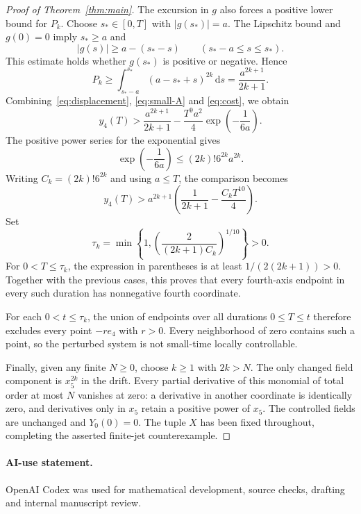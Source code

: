 \documentclass[11pt,a4paper]{article}
\newcommand{\dd}{\,\mathrm{d}}
\begin{document}
\begin{proof}[Proof of Theorem~\ref{thm:main}]
The excursion in $g$ also forces a positive lower bound for $P_k$.
Choose $s_*\in[0,T]$ with $|g(s_*)|=a$.
The Lipschitz bound and $g(0)=0$ imply $s_*\ge a$ and
\[
 |g(s)|\ge a-(s_*-s)\qquad (s_*-a\le s\le s_*).
\]
This estimate holds whether $g(s_*)$ is positive or negative. Hence
\begin{equation}\label{eq:cost}
 P_k\ge\int_{s_*-a}^{s_*}(a-s_*+s)^{2k}\dd s
       =\frac{a^{2k+1}}{2k+1}.
\end{equation}
Combining~\eqref{eq:displacement}, \eqref{eq:small-A} and
\eqref{eq:cost}, we obtain
\begin{equation}\label{eq:comparison}
 y_4(T)>\frac{a^{2k+1}}{2k+1}
          -\frac{T^9a^2}{4}\exp\left(-\frac1{6a}\right).
\end{equation}
The positive power series for the exponential gives
\[
 \exp\left(-\frac1{6a}\right)
 \le (2k)!6^{2k}a^{2k}.
\]
Writing $C_k=(2k)!6^{2k}$ and using $a\le T$, the comparison becomes
\[
 y_4(T)>a^{2k+1}\left(\frac1{2k+1}-\frac{C_kT^{10}}4\right).
\]
Set
\begin{equation}\label{eq:tau}
 \tau_k=\min\left\{1,
       \left(\frac{2}{(2k+1)C_k}\right)^{1/10}\right\}>0.
\end{equation}
For $0<T\le\tau_k$, the expression in parentheses is at least
$1/(2(2k+1))>0$.
Together with the previous cases, this proves that every fourth-axis
endpoint in every such duration has nonnegative fourth coordinate.

For each $0<t\le\tau_k$, the union of endpoints over all durations
$0\le T\le t$ therefore excludes every point $-r e_4$ with $r>0$.
Every neighborhood of zero contains such a point, so the perturbed system
is not small-time locally controllable.

Finally, given any finite $N\ge0$, choose $k\ge1$ with $2k>N$.
The only changed field component is $x_5^{2k}$ in the drift.
Every partial derivative of this monomial of total order at most $N$
vanishes at zero: a derivative in another coordinate is identically zero,
and derivatives only in $x_5$ retain a positive power of $x_5$.
The controlled fields are unchanged and $Y_0(0)=0$.
The tuple $X$ has been fixed throughout, completing the asserted
finite-jet counterexample.
\end{proof}

\paragraph{AI-use statement.}
OpenAI Codex was used for mathematical development, source checks, drafting
and internal manuscript review.
\end{document}
